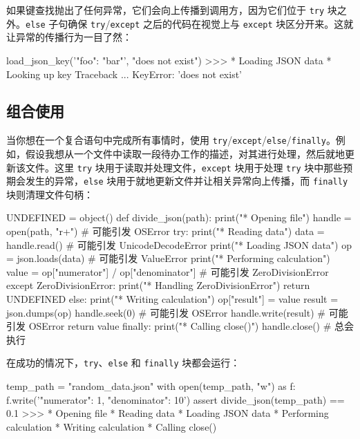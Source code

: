 如果键查找抛出了任何异常，它们会向上传播到调用方，因为它们位于 \texttt{try} 块之外。\texttt{else} 子句确保 \texttt{try}/\texttt{except} 之后的代码在视觉上与 \texttt{except} 块区分开来。这就让异常的传播行为一目了然：

\begin{codebox}[python]
load_json_key('{"foo": "bar"}', "does not exist")
>>>
* Loading JSON data
* Looking up key
Traceback ...
KeyError: 'does not exist'
\end{codebox}

\subsection{组合使用}

当你想在一个复合语句中完成所有事情时，使用 \texttt{try}/\texttt{except}/\texttt{else}/\texttt{finally}。例如，假设我想从一个文件中读取一段待办工作的描述，对其进行处理，然后就地更新该文件。这里 \texttt{try} 块用于读取并处理文件，\texttt{except} 块用于处理 \texttt{try} 块中那些预期会发生的异常，\texttt{else} 块用于就地更新文件并让相关异常向上传播，而 \texttt{finally} 块则清理文件句柄：

\begin{codebox}[python]
UNDEFINED = object()
def divide_json(path):
    print("* Opening file")
    handle = open(path, "r+")                       # 可能引发 OSError
    try:
        print("* Reading data")
        data = handle.read()                        # 可能引发 UnicodeDecodeError
        print("* Loading JSON data")
        op = json.loads(data)                       # 可能引发 ValueError
        print("* Performing calculation")
        value = op["numerator"] / op["denominator"] # 可能引发 ZeroDivisionError
    except ZeroDivisionError:
        print("* Handling ZeroDivisionError")
        return UNDEFINED
    else:
        print("* Writing calculation")
        op["result"] = value
        result = json.dumps(op)
        handle.seek(0)                              # 可能引发 OSError
        handle.write(result)                        # 可能引发 OSError
        return value
    finally:
        print("* Calling close()")
        handle.close()                              # 总会执行
\end{codebox}

在成功的情况下，\texttt{try}、\texttt{else} 和 \texttt{finally} 块都会运行：

\begin{codebox}[python]
temp_path = "random_data.json"
with open(temp_path, "w") as f:
    f.write('{"numerator": 1, "denominator": 10}')
assert divide_json(temp_path) == 0.1
>>>
* Opening file
* Reading data
* Loading JSON data
* Performing calculation
* Writing calculation
* Calling close()
\end{codebox}

